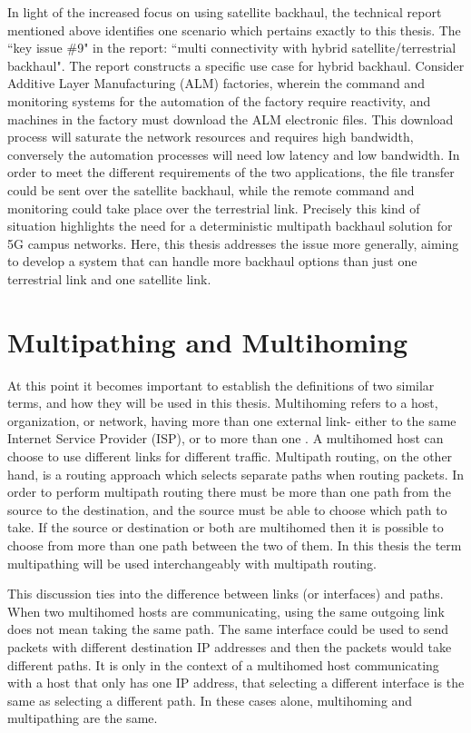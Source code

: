 In light of the increased focus on using satellite backhaul, the technical report mentioned above identifies one scenario which pertains exactly to this thesis. The “key issue \#9" in the report: “multi connectivity with hybrid satellite/terrestrial backhaul". The report constructs a specific use case for hybrid backhaul. Consider Additive Layer Manufacturing (ALM) factories, wherein the command and monitoring systems for the automation of the factory require reactivity, and machines in the factory must download the ALM electronic files. This download process will saturate the network resources and requires high bandwidth, conversely the automation processes will need low latency and low bandwidth. In order to meet the different requirements of the two applications, the file transfer could be sent over the satellite backhaul, while the remote command and monitoring could take place over the terrestrial link. Precisely this kind of situation highlights the need for a deterministic multipath backhaul solution for 5G campus networks. Here, this thesis addresses the issue more generally, aiming to develop a system that can handle more backhaul options than just one terrestrial link and one satellite link.


\section{Multipathing and Multihoming}

At this point it becomes important to establish the definitions of two similar terms, and how they will be used in this thesis. Multihoming refers to a host, organization, or network, having more than one external link- either to the same Internet Service Provider (ISP), or to more than one \cite{akella2003measurement}. A multihomed host can choose to use different links for different traffic. Multipath routing, on the other hand, is a routing approach which selects separate paths when routing packets. In order to perform multipath routing there must be more than one path from the source to the destination, and the source must be able to choose which path to take. If the source or destination or both are multihomed then it is possible to choose from more than one path between the two of them. In this thesis the term multipathing will be used interchangeably with multipath routing.

This discussion ties into the difference between links (or interfaces) and paths. When two multihomed hosts are communicating, using the same outgoing link does not mean taking the same path. The same interface could be used to send packets with different destination IP addresses and then the packets would take different paths. It is only in the context of a multihomed host communicating with a host that only has one IP address, that selecting a different interface is the same as selecting a different path. In these cases alone, multihoming and multipathing are the same.

